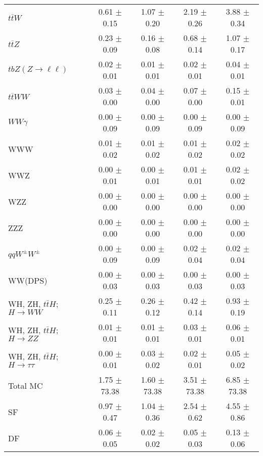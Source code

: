 \begin{tabular}{l|cccc}
                   $t\overline{t}W$ &  0.61 $\pm$  0.15 &  1.07 $\pm$  0.20 &  2.19 $\pm$  0.26 &  3.88 $\pm$  0.34 \\
                   $t\overline{t}Z$ &  0.23 $\pm$  0.09 &  0.16 $\pm$  0.08 &  0.68 $\pm$  0.14 &  1.07 $\pm$  0.17 \\
    $tbZ (Z \rightarrow \ell \ell)$ &  0.02 $\pm$  0.01 &  0.01 $\pm$  0.01 &  0.02 $\pm$  0.01 &  0.04 $\pm$  0.01 \\
                  $t\overline{t}WW$ &  0.03 $\pm$  0.00 &  0.04 $\pm$  0.00 &  0.07 $\pm$  0.00 &  0.15 $\pm$  0.01 \\
                         $WW\gamma$ &  0.00 $\pm$  0.09 &  0.00 $\pm$  0.09 &  0.00 $\pm$  0.09 &  0.00 $\pm$  0.09 \\
                                WWW &  0.01 $\pm$  0.02 &  0.01 $\pm$  0.02 &  0.01 $\pm$  0.02 &  0.02 $\pm$  0.02 \\
                                WWZ &  0.00 $\pm$  0.01 &  0.00 $\pm$  0.01 &  0.01 $\pm$  0.01 &  0.02 $\pm$  0.02 \\
                                WZZ &  0.00 $\pm$  0.00 &  0.00 $\pm$  0.00 &  0.00 $\pm$  0.00 &  0.00 $\pm$  0.00 \\
                                ZZZ &  0.00 $\pm$  0.00 &  0.00 $\pm$  0.00 &  0.00 $\pm$  0.00 &  0.00 $\pm$  0.00 \\
                 $qqW^{\pm}W^{\pm}$ &  0.00 $\pm$  0.09 &  0.00 $\pm$  0.09 &  0.02 $\pm$  0.04 &  0.02 $\pm$  0.04 \\
                            WW(DPS) &  0.00 $\pm$  0.03 &  0.00 $\pm$  0.03 &  0.00 $\pm$  0.03 &  0.00 $\pm$  0.03 \\
WH, ZH, $t\bar{t}H$; $H \rightarrow WW$ &  0.25 $\pm$  0.11 &  0.26 $\pm$  0.12 &  0.42 $\pm$  0.14 &  0.93 $\pm$  0.19 \\
WH, ZH, $t\bar{t}H$; $H \rightarrow ZZ$ &  0.01 $\pm$  0.01 &  0.01 $\pm$  0.01 &  0.03 $\pm$  0.01 &  0.06 $\pm$  0.01 \\
WH, ZH, $t\bar{t}H$; $H \rightarrow \tau\tau$ &  0.00 $\pm$  0.01 &  0.03 $\pm$  0.02 &  0.02 $\pm$  0.01 &  0.05 $\pm$  0.02 \\
\hline\hline
                           Total MC &  1.75 $\pm$ 73.38 &  1.60 $\pm$ 73.38 &  3.51 $\pm$ 73.38 &  6.85 $\pm$ 73.38 \\
\hline
                                 SF &  0.97 $\pm$  0.47 &  1.04 $\pm$  0.36 &  2.54 $\pm$  0.62 &  4.55 $\pm$  0.86 \\
                                 DF &  0.06 $\pm$  0.05 &  0.02 $\pm$  0.02 &  0.05 $\pm$  0.03 &  0.13 $\pm$  0.06 \\

\end{tabular}
